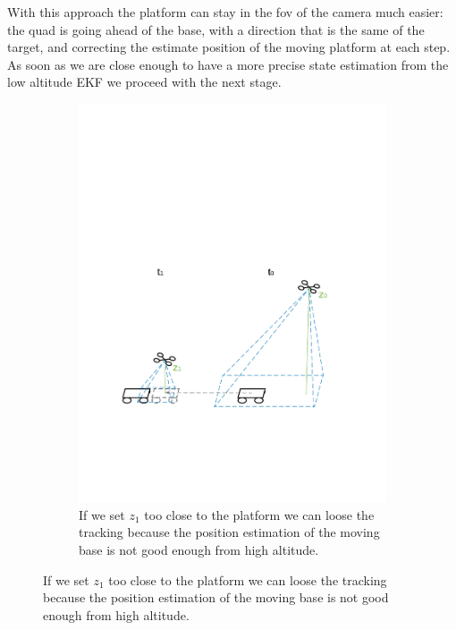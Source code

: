 With this approach the platform can stay in the fov of the camera much easier:  the quad is going ahead of the base, with a direction that is the same of the target, and correcting the estimate position of the moving platform at each step. \\
As soon as we are close enough to have a more precise state estimation from the low altitude EKF we proceed with the next stage.

\begin{figure}[!htbp]
 \centering
   \begin{subfigure}[b]{0.8\textwidth}
     \includegraphics[width=\textwidth]{img/approach_platform_lose.pdf}
        \caption{If we set $z_1$ too close to the platform we can loose the tracking because the position estimation of the moving base is not good enough from high altitude.}
        \label{fig:loose_platform}
   \end{subfigure}
 \end{figure}
